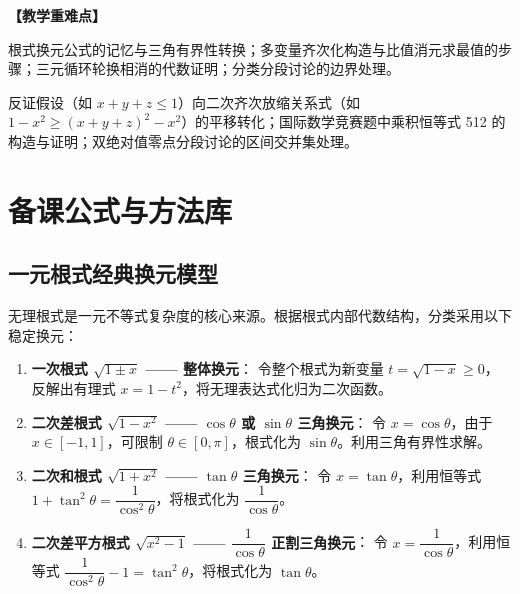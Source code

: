 \documentclass[11pt,a4paper]{ctexart}
\begin{document}
\vspace{0.8em}
\textbf{【教学重难点】}
\begin{description}[leftmargin=2em, itemsep=0.1em, topsep=0.2em]
  \item[重点] 根式换元公式的记忆与三角有界性转换；多变量齐次化构造与比值消元求最值的步骤；三元循环轮换相消的代数证明；分类分段讨论的边界处理。
  \item[难点] 反证假设（如 \(x+y+z \leqslant 1\)）向二次齐次放缩关系式（如 \(1-x^2 \geqslant (x+y+z)^2-x^2\)）的平移转化；国际数学竞赛题中乘积恒等式 512 的构造与证明；双绝对值零点分段讨论的区间交并集处理。
\end{description}

\newpage

\section{备课公式与方法库}

\subsection{一元根式经典换元模型}
无理根式是一元不等式复杂度的核心来源。根据根式内部代数结构，分类采用以下稳定换元：

\begin{enumerate}[label=\arabic*. , leftmargin=2em, itemsep=1.2em, topsep=0.2em]
  \item \textbf{一次根式 \(\sqrt{1 \pm x}\) —— 整体换元}：
  令整个根式为新变量 \(t = \sqrt{1-x} \geqslant 0\)，反解出有理式 \(x = 1-t^2\)，将无理表达式化归为二次函数。
  
  \item \textbf{二次差根式 \(\sqrt{1-x^2}\) —— \(\cos\theta\) 或 \(\sin\theta\) 三角换元}：
  令 \(x = \cos\theta\)，由于 \(x \in [-1, 1]\)，可限制 \(\theta \in [0, \pi]\)，根式化为 \(\sin\theta\)。利用三角有界性求解。
  
  \item \textbf{二次和根式 \(\sqrt{1+x^2}\) —— \(\tan\theta\) 三角换元}：
  令 \(x = \tan\theta\)，利用恒等式 \(1+\tan^2\theta = \dfrac{1}{\cos^2\theta}\)，将根式化为 \(\dfrac{1}{\cos\theta}\)。
  
  \item \textbf{二次差平方根式 \(\sqrt{x^2-1}\) —— \(\dfrac{1}{\cos\theta}\) 正割三角换元}：
  令 \(x = \dfrac{1}{\cos\theta}\)，利用恒等式 \(\dfrac{1}{\cos^2\theta} - 1 = \tan^2\theta\)，将根式化为 \(\tan\theta\)。
\end{enumerate}
\end{document}
